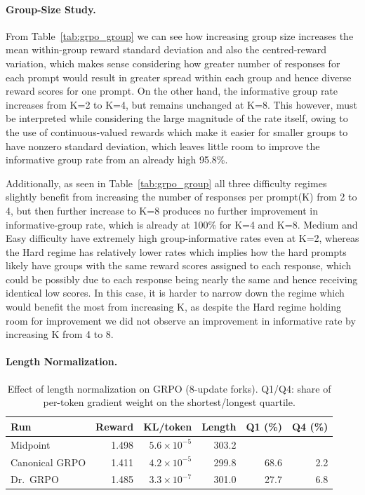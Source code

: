 \documentclass{article}
\newcommand{\tabsetup}{\footnotesize\setlength{\tabcolsep}{4pt}\renewcommand{\arraystretch}{0.95}}
\begin{document}
\paragraph{Group-Size Study.}\label{subsubsec:results-t3-groupsize}
 From Table~\ref{tab:grpo_group} we can see how increasing group size increases the mean within-group reward standard deviation and also the centred-reward variation, which makes sense considering how greater number of responses for each prompt would result in greater spread within each group and hence diverse reward scores for one prompt. On the other hand, the informative group rate increases from K=2 to K=4, but remains unchanged at K=8. This however, must be interpreted while considering the large magnitude of the rate itself, owing to the use of continuous-valued rewards which make it easier for smaller groups to have nonzero standard deviation, which leaves little room to improve the informative group rate from an already high 95.8\%.

 Additionally, as seen in Table~\ref{tab:grpo_group} all three difficulty regimes slightly benefit from increasing the number of responses per prompt(K) from 2 to 4, but then further increase to K=8 produces no further improvement in informative-group rate, which is already at 100\% for K=4 and K=8. Medium and Easy difficulty have extremely high group-informative rates even at K=2, whereas the Hard regime has relatively lower rates which implies how the hard prompts likely have groups with the same reward scores assigned to each response, which could be possibly due to each response being nearly the same and hence receiving identical low scores. In this case, it is harder to narrow down the regime which would benefit the most from increasing K, as despite the Hard regime holding room for improvement we did not observe an improvement in informative rate by increasing K from 4 to 8.

\paragraph{Length Normalization.}\label{subsubsec:results-t3-normalization}
\begin{table}[t]
\centering
\caption{Effect of length normalization on GRPO (8-update forks). Q1/Q4: share of per-token gradient weight on the shortest/longest quartile.}
\label{tab:grpo-norm}
\tabsetup
\begin{tabular}{lrrrrr}
\toprule
Run & Reward & KL/token & Length & Q1 (\%) & Q4 (\%) \\
\midrule
Midpoint & 1.498 & $5.6\times10^{-5}$ & 303.2 & & \\
Canonical GRPO & 1.411 & $4.2\times10^{-5}$ & 299.8 & 68.6 & 2.2 \\
Dr.~GRPO & 1.485 & $3.3\times10^{-7}$ & 301.0 & 27.7 & 6.8 \\
\bottomrule
\end{tabular}
\end{table}
\end{document}

